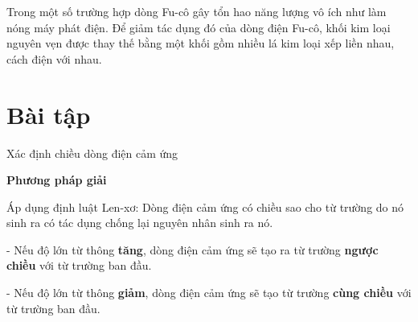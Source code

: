 Trong một số trường hợp dòng Fu-cô gây tổn hao năng lượng vô ích như làm nóng máy phát điện. Để giảm tác dụng đó của dòng điện Fu-cô, khối kim loại nguyên vẹn được thay thế bằng một khối gồm nhiều lá kim loại xếp liền nhau, cách điện với nhau. 


\section{Bài tập}
\begin{dang}{Xác định chiều dòng điện cảm ứng}
\end{dang}

\textbf{Phương pháp giải}

Áp dụng định luật Len-xơ: Dòng điện cảm ứng có chiều sao cho từ trường do nó sinh ra có tác dụng chống lại nguyên nhân sinh ra nó.

-	Nếu độ lớn từ thông \textbf{tăng}, dòng điện cảm ứng sẽ tạo ra từ trường \textbf{ngược chiều} với từ trường ban đầu.

-	Nếu độ lớn từ thông \textbf{giảm}, dòng điện cảm ứng sẽ tạo từ trường \textbf{cùng chiều} với từ trường ban đầu.

\vspace{1em}

